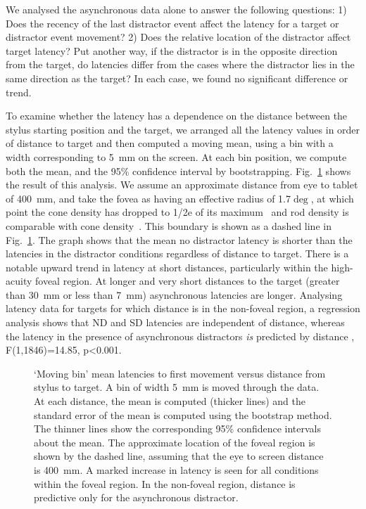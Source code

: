 \documentclass[10pt,letterpaper]{article}
\begin{document}
We analysed the asynchronous data alone to answer the following
questions: 1) Does the recency of the last distractor event affect the
latency for a target or distractor event movement?  2) Does the
relative location of the distractor affect target latency? Put another
way, if the distractor is in the opposite direction from the target,
do latencies differ from the cases where the distractor lies in the
same direction as the target? In each case, we found no significant
difference or trend. %

To examine whether the latency has a dependence on the distance
between the stylus starting position and the target, we arranged all
the latency values in order of distance to target and then computed a
moving mean, using a bin with a width corresponding to 5~mm on the
screen. At each bin position, we compute both the mean, and the 95\%
confidence interval by bootstrapping. Fig.~\ref{latvsdist} shows the
result of this analysis. We assume an approximate distance from eye to
tablet of 400~mm, and take the fovea as having an effective radius of
1.7$\deg$, at which point the cone density has dropped to 1/2e of its
maximum~\cite{hirsch_spatial_1989} and rod density is comparable with
cone density~\cite{jonas_count_1992}. This boundary is shown as a
dashed line in Fig.~\ref{latvsdist}. The graph shows that the mean no
distractor latency is shorter than the latencies in the distractor
conditions regardless of distance to target. There is a notable upward
trend in latency at short distances, particularly within the
high-acuity foveal region. At longer and very short distances to the
target (greater than 30~mm or less than 7~mm) asynchronous latencies
are longer. Analysing latency data for targets for which distance is
in the non-foveal region, a regression analysis shows that ND and SD
latencies are independent of distance, whereas the latency in the
presence of asynchronous distractors \emph{is} predicted by distance
, F(1,1846)=14.85, p\textless0.001.

\begin{figure}[htb!]
\centering
\caption[Mean latencies vs. distance] {`Moving bin' mean latencies to
  first movement versus distance from stylus to target. A bin of width
  5~mm is moved through the data. At each distance, the mean is
  computed (thicker lines) and the standard error of the mean is
  computed using the bootstrap method. The thinner lines show the
  corresponding 95\% confidence intervals about the mean. The
  approximate location of the foveal region is shown by the dashed
  line, assuming that the eye to screen distance is 400~mm. A marked
  increase in latency is seen for all conditions within the foveal
  region. In the non-foveal region, distance is predictive only for
  the asynchronous distractor.}
\label{latvsdist}
\end{figure}
\end{document}
